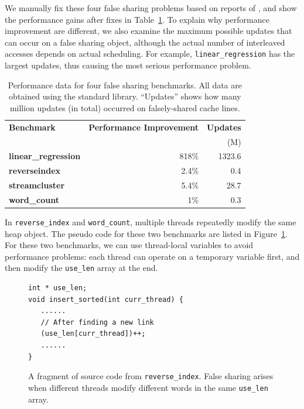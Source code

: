 We manually fix these four false sharing problems based on reports of \SheriffDetect{}, and show the performance gains after fixes in Table~\ref{table:perfafterfix}. To explain why performance improvement are different, we also examine the maximum possible updates that can occur on a false sharing object, although the actual number of interleaved accesses depends on actual scheduling. For example, \texttt{linear\_regression} has the largest updates, thus causing the most serious performance problem. 

\begin{table}
\centering
\begin{tabular}{l|r|r}
\hline
{\bf \small Benchmark} & {\bf \small Performance Improvement} & {\bf \small Updates}\\
 & & (M)\\
\hline
\small \textbf{linear\_regression} & 818\% & 1323.6\\
\small \textbf{reverseindex} &  2.4\% & 0.4\\
\small \textbf{streamcluster} & 5.4\% & 28.7\\
\small \textbf{word\_count} &  1\% & 0.3\\
\hline
\end{tabular}
\caption{Performance data for four false sharing benchmarks. All data are obtained using the standard \pthreads{} library. ``Updates'' shows how many million updates (in total) occurred on falsely-shared cache lines.
\label{table:perfafterfix}}
\end{table}


In \texttt{reverse\_index} and \texttt{word\_count}, multiple threads repeatedly modify the same heap object. The pseudo code for these two benchmarks are listed in Figure~\ref{fig:reverseindex}. For these two benchmarks, we can use thread-local variables to avoid performance problems: each thread can operate on a temporary variable first, and then modify the \texttt{use\_len} array at the end.

\begin{figure}[!t]
\begin{lstlisting}[style=tt]
int * use_len;
void insert_sorted(int curr_thread) {
   ......	
   // After finding a new link
   (use_len[curr_thread])++;
   ......	
}
\end{lstlisting}
\caption{A fragment of source code from \texttt{reverse\_index}. False sharing arises when different threads 
modify different words in the same \texttt{use\_len} array. 
\label{fig:reverseindex}}
\end{figure}

